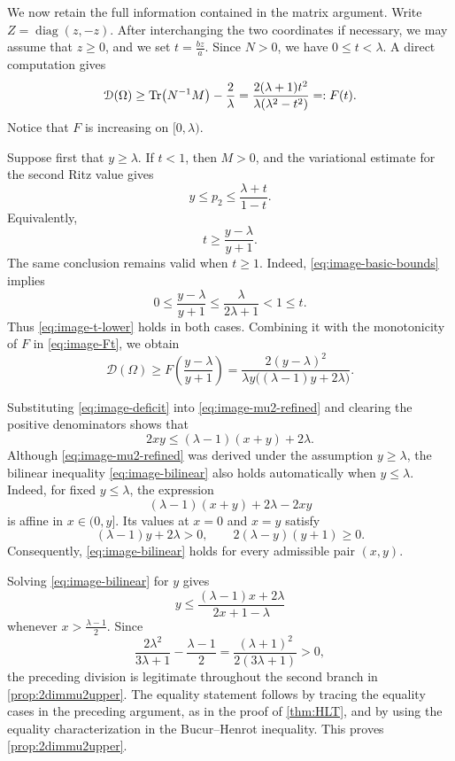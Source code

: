 \documentclass{amsart}
\numberwithin{equation}{section}
\theoremstyle{plain}
\theoremstyle{definition}
\theoremstyle{plain}
\theoremstyle{remark}
\numberwithin{figure}{section}
\DeclareMathOperator{\diag}{diag}
\newcommand{\D}{\mathcal{D}(\Omega)}
\begin{document}
We now retain the full information contained in the matrix argument. Write $Z=\diag(z,-z)$. After interchanging the two coordinates if necessary, we may assume that $z\geq0$, and we set $t=\frac{bz}{a}$. Since $N>0$, we have $0\leq t<\lambda$. A direct computation gives
\begin{equation}
    \label{eq:image-Ft}
    \D \geq \Tr(N^{-1}M)-\frac{2}{\lambda} =\frac{2(\lambda+1)t^2} {\lambda(\lambda^2-t^2)} =:F(t).
\end{equation}
Notice that $F$ is increasing on $[0,\lambda)$.

Suppose first that $y\geq\lambda$. If $t<1$, then $M>0$, and the variational estimate for the second Ritz value gives
\[
    y\leq p_2 \leq \frac{\lambda+t}{1-t}.
\]
Equivalently,
\begin{equation}
    \label{eq:image-t-lower}
    t\geq \frac{y-\lambda}{y+1}.
\end{equation}
The same conclusion remains valid when $t\geq1$. Indeed,
\cref{eq:image-basic-bounds} implies
\[
    0\leq\frac{y-\lambda}{y+1} \leq\frac{\lambda}{2\lambda+1} <1\leq t.
\]
Thus \cref{eq:image-t-lower} holds in both cases. Combining it with the monotonicity of $F$ in \cref{eq:image-Ft}, we obtain
\begin{equation}
    \label{eq:image-mu2-refined}
    \D\geq F\left(\frac{y-\lambda}{y+1}\right) = \frac{2(y-\lambda)^2} {\lambda y\big((\lambda-1)y+2\lambda\big)}.
\end{equation}

Substituting \cref{eq:image-deficit} into \cref{eq:image-mu2-refined} and clearing the positive denominators shows that
\begin{equation}
    \label{eq:image-bilinear}
    2xy\leq(\lambda-1)(x+y)+2\lambda.
\end{equation}
Although \cref{eq:image-mu2-refined} was derived under the assumption $y\geq\lambda$, the bilinear inequality \cref{eq:image-bilinear} also holds automatically when $y\leq\lambda$. Indeed, for fixed $y\leq\lambda$, the expression
\[
    (\lambda-1)(x+y)+2\lambda-2xy
\]
is affine in $x\in(0,y]$. Its values at $x=0$ and $x=y$ satisfy
\[
    (\lambda-1)y+2\lambda>0, \qquad 2(\lambda-y)(y+1)\geq0.
\]
Consequently, \cref{eq:image-bilinear} holds for every admissible pair $(x,y)$.

Solving \cref{eq:image-bilinear} for $y$ gives
\[
    y\leq \frac{(\lambda-1)x+2\lambda} {2x+1-\lambda}
\]
whenever $x>\frac{\lambda-1}{2}$. Since
\[
    \frac{2\lambda^2}{3\lambda+1}-\frac{\lambda-1}{2}=\frac{(\lambda+1)^2}{2(3\lambda+1)}>0,
\]
the preceding division is legitimate throughout the second branch in \cref{prop:2dimmu2upper}. The equality statement follows by tracing the equality cases in the preceding argument, as in the proof of \cref{thm:HLT}, and by using  the equality characterization in the Bucur--Henrot inequality. This proves \cref{prop:2dimmu2upper}.
\end{document}
